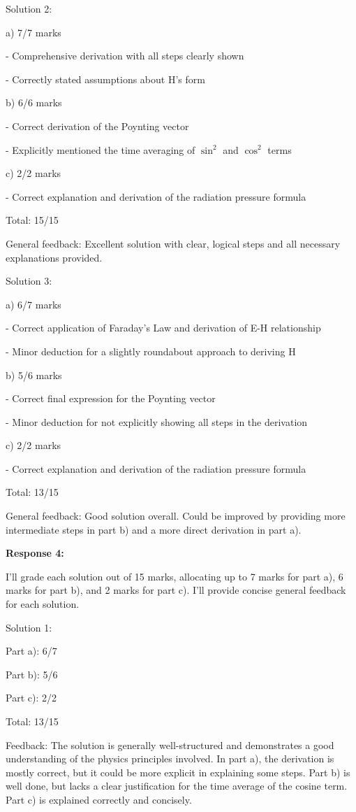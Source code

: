 \documentclass[a4paper,11pt]{article}
\begin{document}
Solution 2:

a) 7/7 marks

- Comprehensive derivation with all steps clearly shown

- Correctly stated assumptions about H's form

b) 6/6 marks

- Correct derivation of the Poynting vector

- Explicitly mentioned the time averaging of \(\sin^2\) and \(\cos^2\) terms

c) 2/2 marks

- Correct explanation and derivation of the radiation pressure formula

Total: 15/15

General feedback: Excellent solution with clear, logical steps and all necessary explanations provided.

Solution 3:

a) 6/7 marks

- Correct application of Faraday's Law and derivation of E-H relationship

- Minor deduction for a slightly roundabout approach to deriving H

b) 5/6 marks

- Correct final expression for the Poynting vector

- Minor deduction for not explicitly showing all steps in the derivation

c) 2/2 marks

- Correct explanation and derivation of the radiation pressure formula

Total: 13/15

General feedback: Good solution overall. Could be improved by providing more intermediate steps in part b) and a more direct derivation in part a).

\bigskip
\textbf{Response 4:}

I'll grade each solution out of 15 marks, allocating up to 7 marks for part a), 6 marks for part b), and 2 marks for part c). I'll provide concise general feedback for each solution.

Solution 1:

Part a): 6/7

Part b): 5/6

Part c): 2/2

Total: 13/15

Feedback: The solution is generally well-structured and demonstrates a good understanding of the physics principles involved. In part a), the derivation is mostly correct, but it could be more explicit in explaining some steps. Part b) is well done, but lacks a clear justification for the time average of the cosine term. Part c) is explained correctly and concisely.
\end{document}
